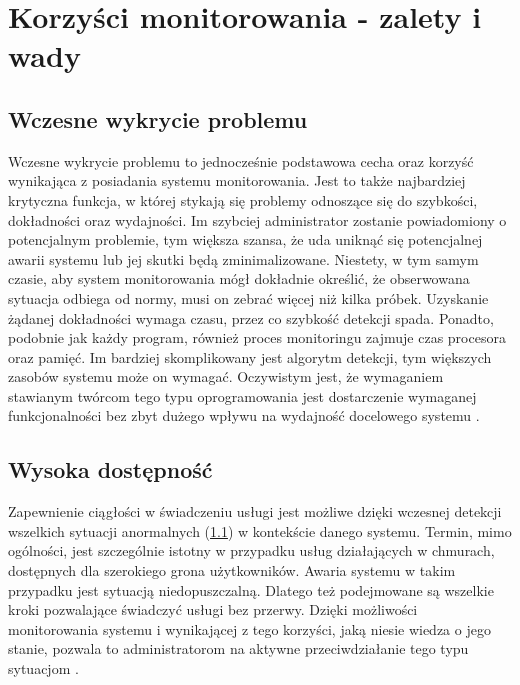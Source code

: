 \section{Korzyści monitorowania - zalety i wady}
\label{chapter:monitoring:advantages}

    \subsection{Wczesne wykrycie problemu}
    \label{chapter:monitoring:advantages:early_detection}
    Wczesne wykrycie problemu to jednocześnie podstawowa cecha oraz korzyść wynikająca z posiadania systemu monitorowania. 
    Jest to także najbardziej krytyczna funkcja, w której stykają się problemy odnoszące się
    do szybkości, dokładności oraz wydajności. Im szybciej administrator zostanie
    powiadomiony o potencjalnym problemie, tym większa szansa, że uda uniknąć się potencjalnej
    awarii systemu lub jej skutki będą zminimalizowane. Niestety, w tym samym czasie, 
    aby system monitorowania mógł dokładnie określić, że obserwowana sytuacja odbiega od normy,
    musi on zebrać więcej niż kilka próbek. Uzyskanie żądanej dokładności wymaga czasu, 
    przez co szybkość detekcji spada. Ponadto, podobnie jak każdy program, również proces
    monitoringu zajmuje czas procesora oraz pamięć. Im bardziej skomplikowany jest algorytm
    detekcji, tym większych zasobów systemu może on wymagać. Oczywistym jest, że wymaganiem
    stawianym twórcom tego typu oprogramowania jest dostarczenie wymaganej funkcjonalności
    bez zbyt dużego wpływu na wydajność docelowego systemu \cite{monitoring_and_alerting}. 
    
    \subsection{Wysoka dostępność}
    \label{chapter:monitoring:advantages:high_availability}
    Zapewnienie ciągłości w świadczeniu usługi jest możliwe dzięki wczesnej detekcji
    wszelkich sytuacji anormalnych (\ref{chapter:monitoring:advantages:early_detection}) w kontekście danego systemu. 
    Termin, mimo ogólności, jest szczególnie istotny w przypadku usług działających w chmurach, dostępnych
    dla szerokiego grona użytkowników. Awaria systemu w takim przypadku jest sytuacją niedopuszczalną. Dlatego
    też podejmowane są wszelkie kroki pozwalające świadczyć usługi bez przerwy. Dzięki możliwości
    monitorowania systemu i wynikającej z tego korzyści, jaką niesie wiedza o jego stanie, pozwala to
    administratorom na aktywne przeciwdziałanie tego typu sytuacjom \cite{monitoring_and_alerting}. 
    
